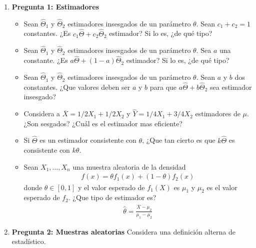 \documentclass{assignment}
\begin{document}
\maketitle

\begin{enumerate}

\item \textbf{Pregunta 1: Estimadores}

\begin{itemize}
    \item Sean $\hat{\Theta}_1$ y $\hat{\Theta}_2$ estimadores insesgados de un parámetro $\theta$. Sean $c_1+c_2=1$ constantes. ¿Es $c_1\hat{\Theta}+c_2\hat{\Theta}_2$ estimador? Si lo es, ¿de qué tipo?
    \item Sean $\hat{\Theta}_1$ y $\hat{\Theta}_2$ estimadores insesgados de un parámetro $\theta$. Sea $a$ una constante. ¿Es $a\hat{\Theta} + (1-a)\hat{\Theta}_2$ estimador? Si lo es, ¿de qué tipo?
    \item Sean $\hat{\Theta}_1$ y $\hat{\Theta}_2$ estimadores insesgados de un parámetro $\theta$. Sean $a$ y $b$ dos constantes. ¿Que valores deben ser $a$ y $b$ para que $a\hat{\Theta} + b\hat{\Theta}_2$ sea estimador insesgado? 
    \item Considera a $\overline{X} = 1/2 X_1 + 1/2 X_2$ y $\hat{Y} = 1/4 X_1 + 3/4 X_2$ estimadores de $\mu$. ¿Son sesgados? ¿Cuál es el estimador mas eficiente? 
    \item Si $\hat{\Theta}$ es un estimador consistente con $\theta$, ¿Que tan cierto es que $k\hat{\Theta}$ es consistente con $k\theta.$ 
    \item Sean $X_1, \dots, X_n$ una muestra aleatoria de la densidad 
    \begin{align*}
        f(x) = \theta f_1(x)+ (1-\theta)f_2(x)
    \end{align*}
    donde $\theta \in [0,1]$ y el valor esperado de $f_1(X)$ es $\mu_1$ y $\mu_2$ es el valor esperado de $f_2.$
    ¿Que tipo de estimador es?
    \begin{align*}
        \hat{\theta}= \frac{\overline{X}- \mu_2}{\mu_1-\mu_2}
    \end{align*}
\end{itemize}


\item \textbf{Pregunta 2: Muestras aleatorias}
Considera una definición alterna de estadístico. 


\end{enumerate}
\end{document}
